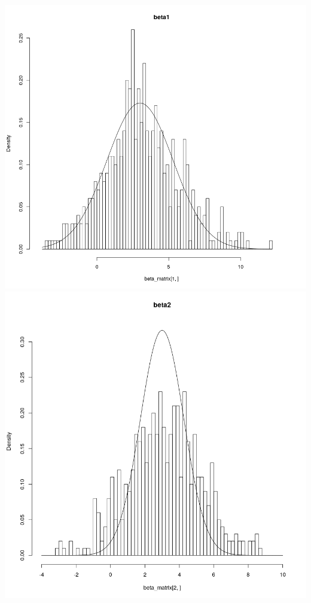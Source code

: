 \documentclass[a4paper,11pt]{article}
\begin{document}
\includegraphics[scale=.35]{beta1_3.png} 
\includegraphics[scale=.35]{beta2.png} 
\end{document}
